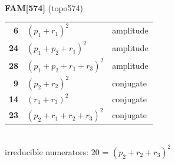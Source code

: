 \documentclass[10pt]{article}
\begin{document}
\begin{minipage}[t]{0.48\textwidth}
{}\\[2mm]\textbf{FAM[574]} (topo574)\\[2pt]{\footnotesize\begin{tabular}{@{}r@{\ \ }l@{\ \ }l@{}}\textbf{6} & $(p_1+r_1)^2$ & amplitude\\
\textbf{24} & $(p_1+p_2+r_1)^2$ & amplitude\\
\textbf{28} & $(p_1+p_2+r_1+r_3)^2$ & amplitude\\
\textbf{9} & $(p_2+r_2)^2$ & conjugate\\
\textbf{14} & $(r_1+r_3)^2$ & conjugate\\
\textbf{23} & $(p_2+r_1+r_2+r_3)^2$ & conjugate\\\end{tabular}}\\[2pt]{\scriptsize irreducible numerators: 20 = $(p_2+r_2+r_3)^2$}\end{minipage}

\bigskip
\end{document}
